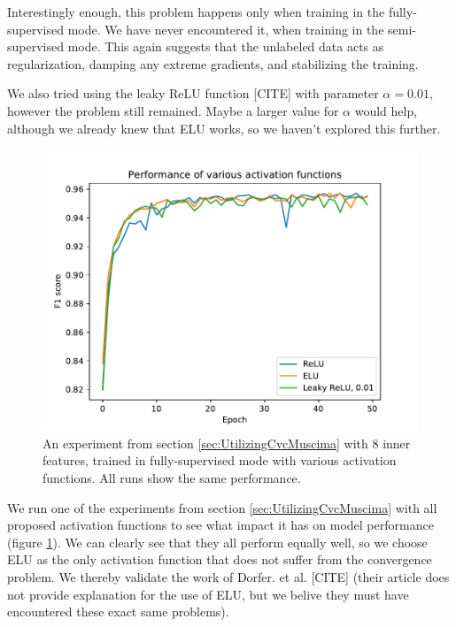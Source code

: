 Interestingly enough, this problem happens only when training in the fully-supervised mode. We have never encountered it, when training in the semi-supervised mode. This again suggests that the unlabeled data acts as regularization, damping any extreme gradients, and stabilizing the training.

We also tried using the leaky ReLU function [CITE] with parameter $\alpha = 0.01$, however the problem still remained. Maybe a larger value for $\alpha$ would help, although we already knew that ELU works, so we haven't explored this further.

\begin{figure}[ht]
    \centering
    \includegraphics[width=140mm]{../../figures/03-activation-function/performance.pdf}
    \caption{An experiment from section \ref{sec:UtilizingCvcMuscima} with 8 inner features, trained in fully-supervised mode with various activation functions. All runs show the same performance.}
    \label{fig:ActivationFunctionPerformances}
\end{figure}

We run one of the experiments from section \ref{sec:UtilizingCvcMuscima} with all proposed activation functions to see what impact it has on model performance (figure \ref{fig:ActivationFunctionPerformances}). We can clearly see that they all perform equally well, so we choose ELU as the only activation function that does not suffer from the convergence problem. We thereby validate the work of Dorfer. et al. [CITE] (their article does not provide explanation for the use of ELU, but we belive they must have encountered these exact same problems).
